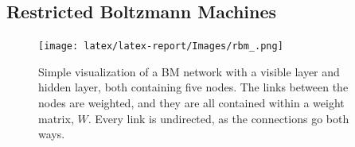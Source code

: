 \subsection{Restricted Boltzmann Machines}



\begin{figure}[H]
\begin{center}\texttt{[image: latex/latex-report/Images/rbm\_.png]}
\end{center}
\caption{Simple visualization of a BM network with a visible layer and hidden layer, both containing five nodes. The links between the nodes are weighted, and they are all contained within a weight matrix, $W$. Every link is undirected, as the connections go both ways.}
\label{fig:vis_BM}
\end{figure}




